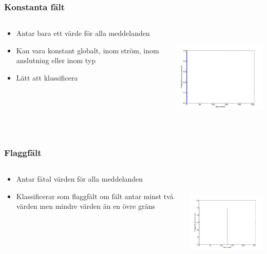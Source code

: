 \documentclass[xetex]{beamer}
\begin{document}
    \begin{frame}
        \frametitle{Konstanta fält}
        \begin{columns}[t]
            \begin{column}[T]{6cm}
                \begin{itemize}
                    \item Antar bara ett värde för alla meddelanden
                    \item Kan vara konstant globalt, inom ström, inom
                        anslutning eller inom typ
                    \item Lätt att klassificera
                \end{itemize}
            \end{column}
            \begin{column}[T]{6cm}
                \includegraphics[height=5cm]{img/const_one.pdf}
            \end{column}
        \end{columns}
    \end{frame}
    \begin{frame}
        \frametitle{Flaggfält}
        \begin{columns}[t]
            \begin{column}[T]{6cm}
                \begin{itemize}
                    \item Antar fåtal värden för alla meddelanden
                    \item Klassificerar som flaggfält om fält antar minst
                        två värden men mindre värden än en övre gräns
                \end{itemize}
            \end{column}
            \begin{column}[T]{6cm}
                \includegraphics[height=5cm]{img/flag.pdf}
            \end{column}
        \end{columns}
    \end{frame}
\end{document}
